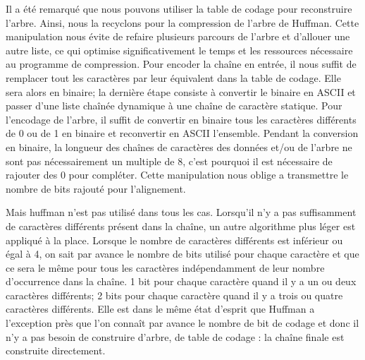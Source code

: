         Il a été remarqué que nous pouvons utiliser la table de codage pour reconstruire l'arbre. Ainsi, nous la recyclons pour la compression de l'arbre de Huffman. Cette manipulation nous évite de refaire plusieurs parcours de l'arbre et d'allouer une autre liste, ce qui optimise significativement le temps et les ressources nécessaire au programme de compression.
        Pour encoder la chaîne en entrée, il nous suffit de remplacer tout les caractères par leur équivalent dans la table de codage. Elle sera alors en binaire; la dernière étape consiste à convertir le binaire en ASCII et passer d'une liste chaînée dynamique à une chaîne de caractère statique.
        Pour l'encodage de l'arbre, il suffit de convertir en binaire tous les caractères différents de 0 ou de 1 en binaire et reconvertir en ASCII l'ensemble.
        Pendant la conversion en binaire, la longueur des chaînes de caractères des données et/ou de l'arbre ne sont pas nécessairement un multiple de 8, c'est pourquoi il est nécessaire de rajouter des 0 pour compléter. Cette manipulation nous oblige a transmettre le nombre de bits rajouté pour l'alignement.
        
        Mais huffman n'est pas utilisé dans tous les cas. Lorsqu'il n'y a pas suffisamment de caractères différents présent dans la chaîne, un autre algorithme plus léger est appliqué à la place. Lorsque le nombre de caractères différents est inférieur ou égal à 4, on sait par avance le nombre de bits utilisé pour chaque caractère et que ce sera le même pour tous les caractères indépendamment de leur nombre d'occurrence dans la chaîne. 1 bit pour chaque caractère quand il y a un ou deux caractères différents; 2 bits pour chaque caractère quand il y a trois ou quatre caractères différents. Elle est dans le même état d'esprit que Huffman a l'exception près que l'on connaît par avance le nombre de bit de codage et donc il n'y a pas besoin de construire d'arbre, de table de codage : la chaîne finale est construite directement.
        

